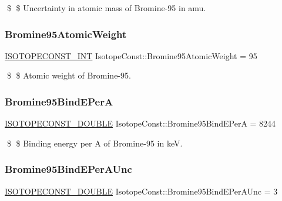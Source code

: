 \$ \$ Uncertainty in atomic mass of Bromine-\/95 in amu. \mbox{\label{group___isotope_const-_bromine-_br95_ga8431bb270d5d3bbda3bae62d915a9ca8}} 
\subsubsection{\texorpdfstring{Bromine95\+Atomic\+Weight}{Bromine95AtomicWeight}}
{\footnotesize\ttfamily \mbox{\hyperlink{group___isotope_const-_macros_ga5f18360b3e99483a35c32d789e62621c}{I\+S\+O\+T\+O\+P\+E\+C\+O\+N\+S\+T\+\_\+\+I\+NT}} Isotope\+Const\+::\+Bromine95\+Atomic\+Weight = 95}

\$ \$ Atomic weight of Bromine-\/95. \mbox{\label{group___isotope_const-_bromine-_br95_ga96f8221d8d022f700bcd3092f304fb25}} 
\subsubsection{\texorpdfstring{Bromine95\+Bind\+E\+PerA}{Bromine95BindEPerA}}
{\footnotesize\ttfamily \mbox{\hyperlink{group___isotope_const-_macros_ga8f45a7272ce02c0b4c65c44636ed719a}{I\+S\+O\+T\+O\+P\+E\+C\+O\+N\+S\+T\+\_\+\+D\+O\+U\+B\+LE}} Isotope\+Const\+::\+Bromine95\+Bind\+E\+PerA = 8244}

\$ \$ Binding energy per A of Bromine-\/95 in keV. \mbox{\label{group___isotope_const-_bromine-_br95_gaecd8af41289c257e4d267f2b526d09c7}} 
\subsubsection{\texorpdfstring{Bromine95\+Bind\+E\+Per\+A\+Unc}{Bromine95BindEPerAUnc}}
{\footnotesize\ttfamily \mbox{\hyperlink{group___isotope_const-_macros_ga8f45a7272ce02c0b4c65c44636ed719a}{I\+S\+O\+T\+O\+P\+E\+C\+O\+N\+S\+T\+\_\+\+D\+O\+U\+B\+LE}} Isotope\+Const\+::\+Bromine95\+Bind\+E\+Per\+A\+Unc = 3}

